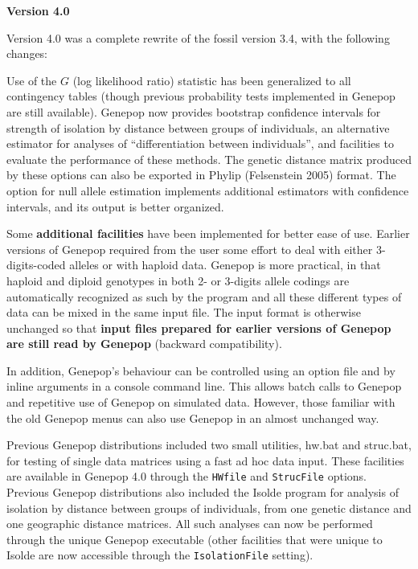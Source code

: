 \documentclass[12pt,]{book}
\begin{document}
\textbf{Version 4.0}

Version 4.0 was a complete rewrite of the fossil version 3.4, with the
following changes:

Use of the \(G\) (log likelihood ratio) statistic has been generalized
to all contingency tables (though previous probability tests implemented
in Genepop are still available). Genepop now provides bootstrap
confidence intervals for strength of isolation by distance between
groups of individuals, an alternative estimator for analyses of
``differentiation between individuals'', and facilities to evaluate the
performance of these methods. The genetic distance matrix produced by
these options can also be exported in Phylip (Felsenstein 2005) format.
The option for null allele estimation implements additional estimators
with confidence intervals, and its output is better organized.

Some \textbf{additional facilities} have been implemented for better
ease of use. Earlier versions of Genepop required from the user some
effort to deal with either 3-digits-coded 
alleles or with haploid data. Genepop is more practical, in that haploid
 and diploid genotypes in both 2- or 3-digits allele
codings are automatically recognized as such by the program and all
these different types of data can be mixed in the same input file. The
input format is otherwise unchanged so that \textbf{input files prepared
for earlier versions of Genepop are still read by Genepop} (backward
compatibility).

In addition, Genepop's behaviour can be controlled using an option file
and by inline arguments in a console command line. This allows batch
calls to Genepop and repetitive use of Genepop on simulated data.
However, those familiar with the old Genepop menus can also use Genepop
in an almost unchanged way.

Previous Genepop distributions included two small utilities, hw.bat
 and struc.bat,  for testing of
single data matrices using a fast ad hoc data input. These facilities
are available in Genepop 4.0 through the \texttt{HWfile}
 and \texttt{StrucFile} options.
 Previous Genepop distributions also included
the Isolde  program for analysis of isolation by
distance between groups of individuals, from one genetic distance and
one geographic distance matrices. All such analyses can now be performed
through the unique Genepop executable (other facilities that were unique
to Isolde are now accessible through the \texttt{IsolationFile}
setting).
\end{document}
